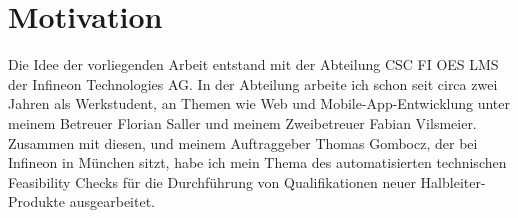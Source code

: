 \section{Motivation}
Die Idee der vorliegenden Arbeit entstand mit der Abteilung CSC FI OES LMS der Infineon Technologies AG. 
In der Abteilung arbeite ich schon seit circa zwei Jahren als Werkstudent, an Themen wie Web und Mobile-App-Entwicklung unter meinem Betreuer Florian Saller und meinem Zweibetreuer Fabian Vilsmeier.
Zusammen mit diesen, und meinem Auftraggeber Thomas Gombocz, der bei Infineon in München sitzt, habe ich mein Thema des automatisierten technischen Feasibility Checks für die Durchführung von Qualifikationen neuer Halbleiter-Produkte ausgearbeitet.
